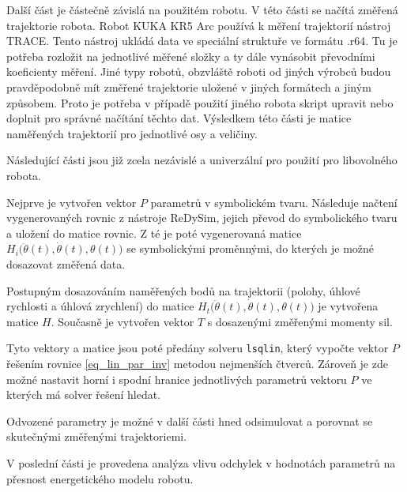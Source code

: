 Další část je částečně závislá na použitém robotu. V této části se načítá změřená trajektorie robota. Robot KUKA KR5 Arc používá k měření trajektorií nástroj TRACE. Tento nástroj ukládá data ve speciální struktuře ve formátu .r64. Tu je potřeba rozložit na jednotlivé měřené složky a ty dále vynásobit převodními koeficienty měření. Jiné typy robotů, obzvláště roboti od jiných výrobců budou pravděpodobně mít změřené trajektorie uložené v jiných formátech a jiným způsobem. Proto je potřeba v případě použití jiného robota skript upravit nebo doplnit pro správné načítání těchto dat. Výsledkem této části je matice naměřených trajektorií pro jednotlivé osy a veličiny. 

Následující části jsou již zcela nezávislé a univerzální pro použití pro libovolného robota.  

Nejprve je vytvořen vektor $P$ parametrů v symbolickém tvaru. Následuje načtení vygenerovaných rovnic z nástroje ReDySim, jejich převod do symbolického tvaru a uložení do matice rovnic. Z té je poté vygenerovaná matice $H_i\big(\ddot{\theta}(t),\dot{\theta}(t),\theta(t)\big)$ se symbolickými proměnnými, do kterých je možné dosazovat změřená data.

Postupným dosazováním naměřených bodů na trajektorii (polohy, úhlové rychlosti a úhlová zrychlení) do matice $H_t\big(\ddot{\theta}(t),\dot{\theta}(t),\theta(t)\big)$ je vytvořena matice $H$. Současně je vytvořen vektor $T$ s dosazenými změřenými momenty sil.

Tyto vektory a matice jsou poté předány solveru \texttt{lsqlin}, který vypočte vektor $P$ řešením rovnice \ref{eq_lin_par_inv} metodou nejmenších čtverců. Zároveň je zde možné nastavit horní i spodní hranice jednotlivých parametrů vektoru $P$ ve kterých má solver řešení hledat.

Odvozené parametry je možné v další části hned odsimulovat a porovnat se skutečnými změřenými trajektoriemi.

V poslední části je provedena analýza vlivu odchylek v hodnotách parametrů na přesnost energetického modelu robotu.
